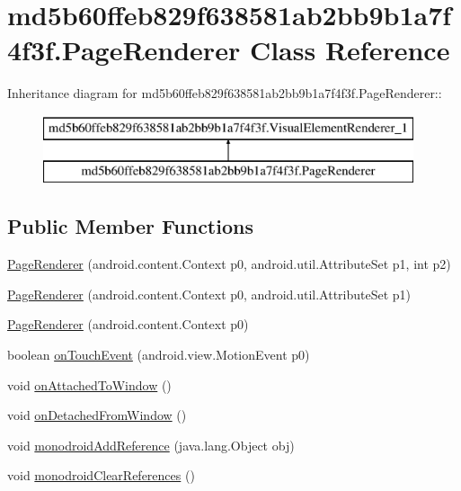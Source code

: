 \hypertarget{classmd5b60ffeb829f638581ab2bb9b1a7f4f3f_1_1_page_renderer}{
\section{md5b60ffeb829f638581ab2bb9b1a7f4f3f.PageRenderer Class Reference}
\label{classmd5b60ffeb829f638581ab2bb9b1a7f4f3f_1_1_page_renderer}
}
Inheritance diagram for md5b60ffeb829f638581ab2bb9b1a7f4f3f.PageRenderer::\begin{figure}[H]
\begin{center}
\leavevmode
\includegraphics[height=2cm]{classmd5b60ffeb829f638581ab2bb9b1a7f4f3f_1_1_page_renderer}
\end{center}
\end{figure}
\subsection*{Public Member Functions}
\begin{CompactItemize}
\item 
\hyperlink{classmd5b60ffeb829f638581ab2bb9b1a7f4f3f_1_1_page_renderer_cb75aacbb9b00a0617d2f6d02687172b}{PageRenderer} (android.content.Context p0, android.util.AttributeSet p1, int p2)
\item 
\hyperlink{classmd5b60ffeb829f638581ab2bb9b1a7f4f3f_1_1_page_renderer_451203d230b83724610cc6a9c0ff6d27}{PageRenderer} (android.content.Context p0, android.util.AttributeSet p1)
\item 
\hyperlink{classmd5b60ffeb829f638581ab2bb9b1a7f4f3f_1_1_page_renderer_fd644ee1ae548adf52a3129fc8384a4d}{PageRenderer} (android.content.Context p0)
\item 
boolean \hyperlink{classmd5b60ffeb829f638581ab2bb9b1a7f4f3f_1_1_page_renderer_83a5007f3a24de66ed291c422b3b2adf}{onTouchEvent} (android.view.MotionEvent p0)
\item 
void \hyperlink{classmd5b60ffeb829f638581ab2bb9b1a7f4f3f_1_1_page_renderer_50c8e09a94fb59f2f11fa7ed1f7296e2}{onAttachedToWindow} ()
\item 
void \hyperlink{classmd5b60ffeb829f638581ab2bb9b1a7f4f3f_1_1_page_renderer_dabdc0dbf9335603861e999017656a19}{onDetachedFromWindow} ()
\item 
void \hyperlink{classmd5b60ffeb829f638581ab2bb9b1a7f4f3f_1_1_page_renderer_89f8e358b3bf48337c91fc57b5aa1a1e}{monodroidAddReference} (java.lang.Object obj)
\item 
void \hyperlink{classmd5b60ffeb829f638581ab2bb9b1a7f4f3f_1_1_page_renderer_c993d3d981957dbc682a298a20ceda2b}{monodroidClearReferences} ()
\end{CompactItemize}
